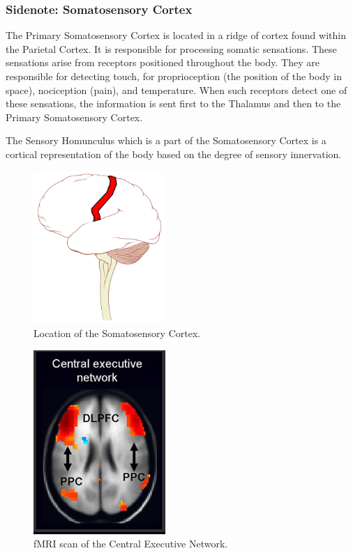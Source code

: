 \documentclass[a4paper, amsfonts, amssymb, amsmath, reprint, showkeys, nofootinbib, twoside]{revtex4-1}
\begin{document}
\subsubsection{Sidenote: Somatosensory Cortex}
The Primary Somatosensory Cortex is located in a ridge of cortex found within the Parietal Cortex.
It is responsible for processing somatic sensations. These sensations arise from receptors
positioned throughout the body. They are responsible for detecting touch, for proprioception
(the position of the body in space), nociception (pain), and temperature. \cite{somato}
When such receptors detect one of these sensations, the information is sent first to
the Thalamus and then to the Primary Somatosensory Cortex.

The Sensory Homunculus which is a part of the Somatosensory Cortex is a cortical representation
of the body based on the degree of sensory innervation. \cite{sensoryhom}

\begin{figure}[H]
  \centering
  \includegraphics[width=5cm]{images/side-somatosensory.png}
  \caption{Location of the Somatosensory Cortex.}
  \label{fig:side-somatosensory}
\end{figure}


\begin{figure}[H]
  \centering
  \includegraphics[width=5cm]{images/fmri-cen.jpg}
  \caption{fMRI scan of the Central Executive Network.}
  \label{fig:fmri-cen}
\end{figure}
\end{document}
